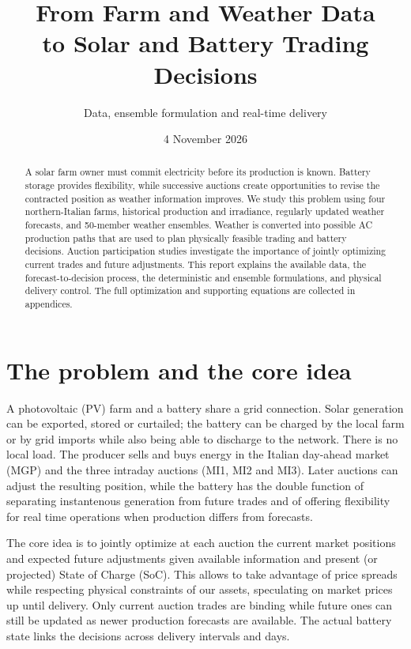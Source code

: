\documentclass[11pt,a4paper]{article}
\title{From Farm and Weather Data\\to Solar and Battery Trading Decisions}
\author{Data, ensemble formulation and real-time delivery}
\date{4 November 2026}
\begin{document}
\maketitle
\begin{abstract}
A solar farm owner must commit electricity before its production is known.
Battery storage provides flexibility, while successive auctions create
opportunities to revise the contracted position as weather information
improves. We study this problem using four northern-Italian farms, historical
production and irradiance, regularly updated weather forecasts, and 50-member
weather ensembles. Weather is converted into possible AC production paths that
are used to plan physically feasible trading and battery decisions.
Auction participation studies investigate the importance of jointly optimizing current trades
and future adjustments.
This report explains the available data, the forecast-to-decision process,
the deterministic and ensemble formulations, and physical delivery control.
The full optimization and supporting
equations are collected in appendices.
\end{abstract}
\tableofcontents
\newpage

\section{The problem and the core idea}
A photovoltaic (PV) farm and a battery share a grid connection. Solar generation
can be exported, stored or curtailed; the battery can be charged by the local farm or by grid imports 
while also being able to discharge to the network. There is no local load.
The producer sells and buys energy in the Italian day-ahead market
(MGP) and the three intraday auctions (MI1, MI2 and MI3). 
Later auctions can adjust the resulting position, while the
battery has the double function of separating instantenous generation 
from future trades and of offering flexibility for real time operations 
when production differs from forecasts.

The core idea is to jointly optimize at each auction the current market positions and 
expected future adjustments given  available information and present 
(or projected) State of Charge (SoC). This allows to take advantage of price 
spreads while respecting physical constraints of our assets, speculating 
on market prices up until delivery. Only current auction trades 
are binding while future ones can still be updated as newer production 
forecasts are available. The actual battery state links the decisions across delivery intervals and days.
\end{document}
